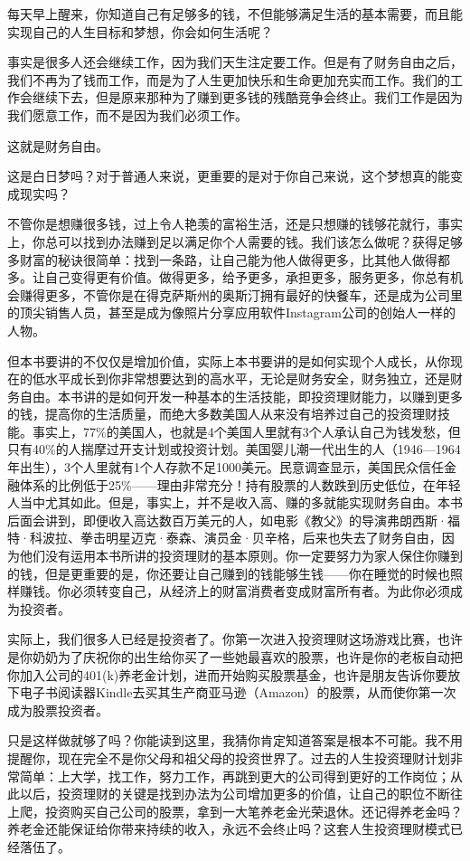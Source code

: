 每天早上醒来，你知道自己有足够多的钱，不但能够满足生活的基本需要，而且能实现自己的人生目标和梦想，你会如何生活呢？

事实是很多人还会继续工作，因为我们天生注定要工作。但是有了财务自由之后，我们不再为了钱而工作，而是为了人生更加快乐和生命更加充实而工作。我们的工作会继续下去，但是原来那种为了赚到更多钱的残酷竞争会终止。我们工作是因为我们愿意工作，而不是因为我们必须工作。

这就是财务自由。

这是白日梦吗？对于普通人来说，更重要的是对于你自己来说，这个梦想真的能变成现实吗？

不管你是想赚很多钱，过上令人艳羡的富裕生活，还是只想赚的钱够花就行，事实上，你总可以找到办法赚到足以满足你个人需要的钱。我们该怎么做呢？获得足够多财富的秘诀很简单：找到一条路，让自己能为他人做得更多，比其他人做得都多。让自己变得更有价值。做得更多，给予更多，承担更多，服务更多，你总有机会赚得更多，不管你是在得克萨斯州的奥斯汀拥有最好的快餐车，还是成为公司里的顶尖销售人员，甚至是成为像照片分享应用软件Instagram公司的创始人一样的人物。

但本书要讲的不仅仅是增加价值，实际上本书要讲的是如何实现个人成长，从你现在的低水平成长到你非常想要达到的高水平，无论是财务安全，财务独立，还是财务自由。本书讲的是如何开发一种基本的生活技能，即投资理财能力，以赚到更多的钱，提高你的生活质量，而绝大多数美国人从来没有培养过自己的投资理财技能。事实上，77\%的美国人，也就是4个美国人里就有3个人承认自己为钱发愁，但只有40\%的人揣摩过开支计划或投资计划。美国婴儿潮一代出生的人（1946—1964年出生），3个人里就有1个人存款不足1000美元。民意调查显示，美国民众信任金融体系的比例低于25\%——理由非常充分！持有股票的人数跌到历史低位，在年轻人当中尤其如此。但是，事实上，并不是收入高、赚的多就能实现财务自由。本书后面会讲到，即便收入高达数百万美元的人，如电影《教父》的导演弗朗西斯·福特·科波拉、拳击明星迈克·泰森、演员金·贝辛格，后来也失去了财务自由，因为他们没有运用本书所讲的投资理财的基本原则。你一定要努力为家人保住你赚到的钱，但是更重要的是，你还要让自己赚到的钱能够生钱——你在睡觉的时候也照样赚钱。你必须转变自己，从经济上的财富消费者变成财富所有者。为此你必须成为投资者。

实际上，我们很多人已经是投资者了。你第一次进入投资理财这场游戏比赛，也许是你奶奶为了庆祝你的出生给你买了一些她最喜欢的股票，也许是你的老板自动把你加入公司的401(k)养老金计划，进而开始购买股票基金，也许是朋友告诉你要放下电子书阅读器Kindle去买其生产商亚马逊（Amazon）的股票，从而使你第一次成为股票投资者。

只是这样做就够了吗？你能读到这里，我猜你肯定知道答案是根本不可能。我不用提醒你，现在完全不是你父母和祖父母的投资世界了。过去的人生投资理财计划非常简单：上大学，找工作，努力工作，再跳到更大的公司得到更好的工作岗位；从此以后，投资理财的关键是找到办法为公司增加更多的价值，让自己的职位不断往上爬，投资购买自己公司的股票，拿到一大笔养老金光荣退休。还记得养老金吗？养老金还能保证给你带来持续的收入，永远不会终止吗？这套人生投资理财模式已经落伍了。

